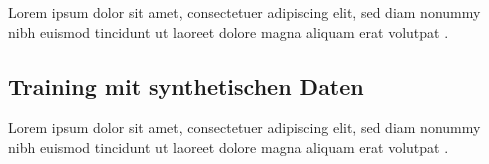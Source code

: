Lorem ipsum dolor sit amet, consectetuer adipiscing elit, sed diam nonummy nibh euismod tincidunt ut laoreet dolore magna aliquam erat volutpat \cite{latexcompanion}. 


\subsection{Training mit synthetischen Daten}
\label{grundlagen_nn_synthetisch}

Lorem ipsum dolor sit amet, consectetuer adipiscing elit, sed diam nonummy nibh euismod tincidunt ut laoreet dolore magna aliquam erat volutpat \cite{latexcompanion}. 


